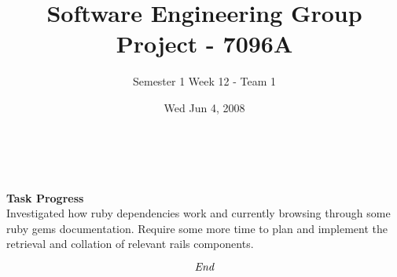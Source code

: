 \documentclass[10pt, a4]{article}
\begin{document}
 
\title{Software Engineering Group Project - 7096A}
\author{Semester 1 Week 12 - Team 1}
\date{Wed Jun 4, 2008}

\maketitle 

 \\

\\

\noindent \textbf{\large Task Progress}\\

\noindent Investigated how ruby dependencies work and currently browsing through some ruby gems documentation. 
Require some more time to plan and implement the retrieval and collation of relevant rails components.

\[\emph{End}\]
 
\end{document}

